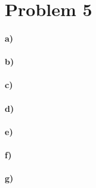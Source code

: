 \documentclass[12pt]{article}
\begin{document}
\section*{Problem 5}

\paragraph{a)}

\paragraph{b)}

\paragraph{c)}

\paragraph{d)}

\paragraph{e)}

\paragraph{f)}

\paragraph{g)}
\end{document}
